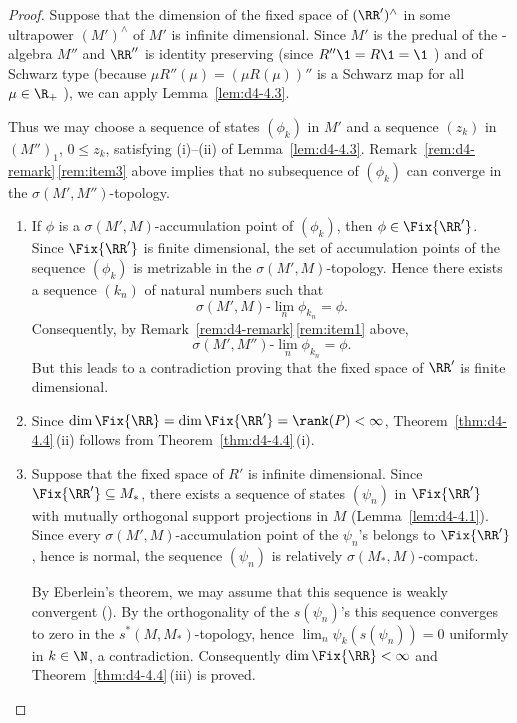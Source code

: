 \begin{proof}
Suppose that the dimension of the fixed space of\/ 
$ (\RR')^{\wedge} $  in some ultrapower $ (M')^{\wedge} $  of\/ $ M' $  is infinite dimensional.
Since $ M' $ is the predual of the \WA-algebra $ M'' $  and $ \RR'' $  is identity preserving (since $ R''\1 = R\1 = \1 $ ) and of Schwarz type (because $ \mu R''(\mu) = (\mu R(\mu))'' $  is a Schwarz map for all $ \mu \in \R_{+} $ ), we can apply Lemma~\ref{lem:d4-4.3}.

Thus we may choose a sequence of states $ (\phi_{k}) $  in $ M' $  and a sequence $ (z_{k}) $  in $ (M'')_{1}$, $ 0 \leq z_{k} $,  satisfying (i)--(ii) of Lemma~\ref{lem:d4-4.3}.
Remark~\ref{rem:d4-remark}\,\ref{rem:item3} above implies that no subsequence of\/ $ (\phi_{k}) $  can converge in the $ \sigma(M',M'') $-topology.
\begin{enumerate}[\upshape (i), wide, labelindent=.25em]
\item
If\/ $ \phi $  is a $ \sigma(M',M) $-accumulation point of\/ $ (\phi_{k}) $, then $ \phi \in \Fix{\RR'} $.
Since $ \Fix{\RR'} $  is finite dimensional, the set of accumulation points of the sequence $ (\phi_{k}) $  is metrizable in the $ \sigma(M',M) $-topology.
Hence there exists a sequence $ (k_{n}) $  of natural numbers such that 
\[
    \sigma(M',M)\text{-}\lim_{n} \phi_{k_{n}} = \phi .
\]
Consequently, by Remark~\ref{rem:d4-remark}\,\ref{rem:item1} above, 
\[ 
    \sigma(M',M'')\text{-}\lim_{n} \phi_{k_{n}}= \phi .
\]
But this leads to a contradiction proving that the fixed space of\/ $ \RR' $  is finite dimensional.

\item
Since $ \dim \Fix{\RR} = \dim \Fix{\RR'} = \rank(P) < \infty $, Theorem~\ref{thm:d4-4.4}\,(ii) follows from Theorem~\ref{thm:d4-4.4}\,(i).

\item
Suppose that the fixed space of\/ $ R' $  is infinite dimensional.
Since $ \Fix{\RR'} \subseteq M_{*} $,  there exists a sequence of states $ (\psi_{n}) $  in $ \Fix{\RR'} $  with mutually orthogonal support projections in $ M $  (Lemma~\ref{lem:d4-4.1}).
Since every $ \sigma(M',M) $-accumulation point of the $ \psi_{n} $'s belongs to $ \Fix{\RR'} $, hence is normal, the sequence $ (\psi_{n}) $  is relatively $ \sigma(M_{*},M) $-compact.

By Eberlein's theorem, we may assume that this sequence is weakly convergent (\textcite{schaefer:1966}).
By the orthogonality of the $ s(\psi_{n}) $'s this sequence converges to zero in the $ s^{*}(M,M_{*}) $-topology, hence $ \lim_{n} \psi_{k}(s(\psi_{n})) = 0 $  uniformly in $ k \in \N $, a contradiction.
Consequently $ \dim \Fix{\RR} < \infty $  and Theorem~\ref{thm:d4-4.4}\,(iii) is proved.


\end{enumerate}
\end{proof}
